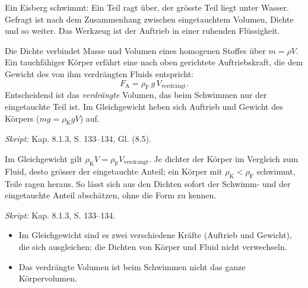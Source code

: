 
Ein Eisberg schwimmt: Ein Teil ragt über, der grösste Teil liegt unter Wasser.
Gefragt ist nach dem Zusammenhang zwischen eingetauchtem Volumen, Dichte und
so weiter. Das Werkzeug ist der Auftrieb in einer ruhenden Flüssigkeit.

\begin{werkzeugkasten}
Die Dichte verbindet Masse und Volumen eines homogenen Stoffes über
$m=\rho V$. Ein tauchfähiger Körper erfährt eine nach oben gerichtete
Auftriebskraft, die dem Gewicht des von ihm verdrängten Fluids entspricht:
\begin{equation}
  F_\mathrm A=\rho_\mathrm F\, g\, V_{\text{verdrängt}}.
\end{equation}
Entscheidend ist das \emph{verdrängte} Volumen, das beim Schwimmen nur der
eingetauchte Teil ist. Im Gleichgewicht heben sich Auftrieb und Gewicht des
Körpers ($mg=\rho_\mathrm K g V$) auf.

\textit{Skript:} Kap. 8.1.3, S. 133--134, Gl. (8.5).
\end{werkzeugkasten}

\begin{werkzeugkasten}
Im Gleichgewicht gilt $\rho_\mathrm K V=\rho_\mathrm F V_{\text{verdrängt}}$.
Je dichter der Körper im Vergleich zum Fluid, desto grösser der eingetauchte
Anteil; ein Körper mit $\rho_\mathrm K<\rho_\mathrm F$ schwimmt, Teile ragen
heraus. So lässt sich aus den Dichten sofort der Schwimm- und der
eingetauchte Anteil abschätzen, ohne die Form zu kennen.

\textit{Skript:} Kap. 8.1.3, S. 133--134.
\end{werkzeugkasten}

\begin{achtung}
\begin{itemize}
  \item Im Gleichgewicht sind es zwei verschiedene Kräfte (Auftrieb und
        Gewicht), die sich ausgleichen; die Dichten von Körper und Fluid nicht
        verwechseln.
  \item Das verdrängte Volumen ist beim Schwimmen nicht das ganze
        Körpervolumen.
\end{itemize}
\end{achtung}
